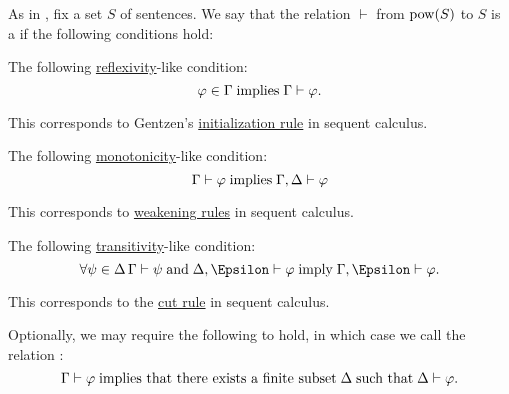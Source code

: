 \begin{definition}\label{def:consequence_relation}
  As in , fix a set \( S \) of sentences. We say that the relation \( \vdash \) from \( \operatorname{pow}(S) \) to \( S \) is a  if the following conditions hold:
  \begin{thmenum}
     The following \hyperref[def:binary_relation/reflexive]{reflexivity}-like condition:
    \begin{equation}\label{eq:def:consequence_relation/reflexivity}
      \varphi \in \Gamma \T{implies} \Gamma \vdash \varphi.
    \end{equation}

    This corresponds to Gentzen's \hyperref[inf:rem:sequent_calculus/init]{initialization rule} in sequent calculus.

     The following \hyperref[def:order_function/preserving]{monotonicity}-like condition:
    \begin{equation}\label{eq:def:consequence_relation/monotonicity}
      \Gamma \vdash \varphi \T{implies} \Gamma, \Delta \vdash \varphi
    \end{equation}

    This corresponds to \hyperref[def:abstract_sequent_calculus_system/rules/weak]{weakening rules} in sequent calculus.

     The following \hyperref[def:binary_relation/transitive]{transitivity}-like condition:
    \begin{equation}\label{eq:def:consequence_relation/transitivity}
      \qforall* {\psi \in \Delta} \Gamma \vdash \psi \T{and} \Delta, \Epsilon \vdash \varphi \T{imply} \Gamma, \Epsilon \vdash \varphi.
    \end{equation}

    This corresponds to the \hyperref[def:abstract_sequent_calculus_system/rules/cut]{cut rule} in sequent calculus.

     Optionally, we may require the following to hold, in which case we call the relation :
    \begin{equation}\label{eq:def:consequence_relation/compactness}
      \Gamma \vdash \varphi \T{implies that there exists a finite subset} \Delta \T{such that} \Delta \vdash \varphi.
    \end{equation}
  \end{thmenum}
\end{definition}
